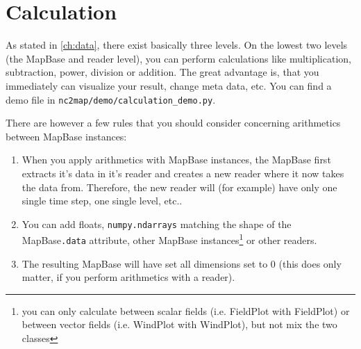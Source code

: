 \section{Calculation} \label{sec:calculation}
As stated in \autoref{ch:data}, there exist basically three levels. On the lowest two levels (the \gls{MapBase} and \gls{reader} level), you can perform calculations like multiplication, subtraction, power, division or addition. The great advantage is, that you immediately can visualize your result, change meta data, etc. You can find a demo file in \lstinline|nc2map/demo/calculation_demo.py|.

There are however a few rules that you should consider concerning arithmetics between \gls{MapBase} instances:
\begin{enumerate}
	\item When you apply arithmetics with MapBase instances, the MapBase first extracts it's data in it's \gls{reader} and creates a new reader where it now takes the data from. Therefore, the new reader will (for example) have only one single time step, one single level, etc..
	\item You can add floats, \lstinline|numpy.ndarrays| matching the shape of the \gls{MapBase}\lstinline|.data| attribute, other \gls{MapBase} instances\footnote{you can only calculate between scalar fields (i.e. \gls{FieldPlot} with \gls{FieldPlot}) or between vector fields (i.e. \gls{WindPlot} with \gls{WindPlot}), but not mix the two classes} or other \glspl{reader}.
	\item The resulting \gls{MapBase} will have set all dimensions set to 0 (this does only matter, if you perform arithmetics with a \gls{reader}).
\end{enumerate}

